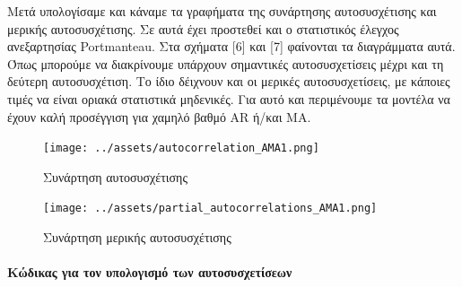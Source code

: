 \documentclass[11pt,]{article}
\newenvironment{Shaded}{}{}
\newcommand{\CommentTok}[1]{\textcolor[rgb]{0.38,0.63,0.69}{\textit{#1}}}
\newcommand{\FloatTok}[1]{\textcolor[rgb]{0.25,0.63,0.44}{#1}}
\newcommand{\NormalTok}[1]{#1}
\newcommand{\StringTok}[1]{\textcolor[rgb]{0.25,0.44,0.63}{#1}}
\let\oldparagraph\paragraph
\renewcommand{\paragraph}[1]{\oldparagraph{#1}\mbox{}}
\begin{document}
\begin{Shaded}
\end{Shaded}

Μετά υπολογίσαμε και κάναμε τα γραφήματα της συνάρτησης αυτοσυσχέτισης
και μερικής αυτοσυσχέτισης. Σε αυτά έχει προστεθεί και ο στατιστικός
έλεγχος ανεξαρτησίας Portmanteau. Στα σχήματα {[}6{]} και {[}7{]}
φαίνονται τα διαγράμματα αυτά. Όπως μπορούμε να διακρίνουμε υπάρχουν
σημαντικές αυτοσυσχετίσεις μέχρι και τη δεύτερη αυτοσυσχέτιση. Το ίδιο
δέιχνουν και οι μερικές αυτοσυσχετίσεις, με κάποιες τιμές να είναι
οριακά στατιστικά μηδενικές. Για αυτό και περιμένουμε τα μοντέλα να
έχουν καλή προσέγγιση για χαμηλό βαθμό AR ή/και MA.

\begin{figure}
\centering
\texttt{[image: ../assets/autocorrelation\_AMA1.png]}
\caption{Συνάρτηση αυτοσυσχέτισης}
\end{figure}

\begin{figure}
\centering
\texttt{[image: ../assets/partial\_autocorrelations\_AMA1.png]}
\caption{Συνάρτηση μερικής αυτοσυσχέτισης}
\end{figure}

\hypertarget{ux3baux3ceux3b4ux3b9ux3baux3b1ux3c2-ux3b3ux3b9ux3b1-ux3c4ux3bfux3bd-ux3c5ux3c0ux3bfux3bbux3bfux3b3ux3b9ux3c3ux3bcux3cc-ux3c4ux3c9ux3bd-ux3b1ux3c5ux3c4ux3bfux3c3ux3c5ux3c3ux3c7ux3b5ux3c4ux3afux3c3ux3b5ux3c9ux3bd}{%
\paragraph{Κώδικας για τον υπολογισμό των
αυτοσυσχετίσεων}\label{ux3baux3ceux3b4ux3b9ux3baux3b1ux3c2-ux3b3ux3b9ux3b1-ux3c4ux3bfux3bd-ux3c5ux3c0ux3bfux3bbux3bfux3b3ux3b9ux3c3ux3bcux3cc-ux3c4ux3c9ux3bd-ux3b1ux3c5ux3c4ux3bfux3c3ux3c5ux3c3ux3c7ux3b5ux3c4ux3afux3c3ux3b5ux3c9ux3bd}}
\end{document}
